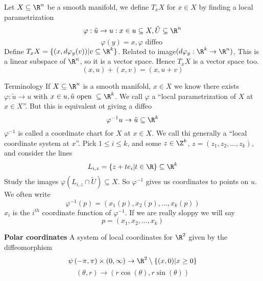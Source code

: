 \begin{definition}
  Let $X \subseteq \R^n$ be a smooth manifold, we define $T_xX$ for $x\in X$ by finding a local parametrization
    $$ \varphi: \tilde{u}\to u : x\in u \subseteq X, \tilde{U} \subseteq \R^n $$
    $$ \varphi(y)=x, \varphi \text{ diffeo }$$
  Define $T_xX=\{(x,d\varphi_y(v)) | v \subseteq \R^k\}$. Related to image$(d\varphi_y:\R^k\to \R^n )$,
  \newline This is a linear subspace of $\R^n$, so it is a vector space. Hence $T_xX$ is a vector space too.
    $$ \left(x,u\right)+\left(x,v \right)=\left(x,u+v\right)$$
\end{definition}
Terminology
\newline  If $X \subseteq \R^n $ is a smooth manifold, $x\in X$ we know there exists $\varphi:\tilde{u}\to u$ with $x\in u, \tilde{u} \text{ open }\subseteq \R^k$.
\newline We call $\varphi $ a ``local parametrization of $X$ at $x\in X$''. But this is equivalent ot giving a diffeo
  $$\varphi^{-1}u %
  \to \tilde{u} %
  \subseteq \R^k$$
  $\varphi^{-1}$ is called a coordinate chart for $X$ at $x\in X$.
\newline We call thi generally a ``local coordinate system at $x$''.
\newline Pick $1\leq i \leq k$, and some $z\in \Z^k$, $z=(z_1,z_2,\dots,z_k)$, and consider the lines
  $$L_{i,z}= \{ z+te_i |t\in \R \}\subseteq \R^k$$
Study the images $\varphi(L_{i,z}\cap \tilde{U})\subseteq X$.
\newline So $\varphi^{-1}$ gives us coordinates to points on $u$. We often write
  $$\varphi^{-1}(p)=\left(x_1(p),x_2(p),\dots,x_k(p)\right)$$
$x_i$ is the $i^{th}$ coordinate function of $\varphi^{-1}$. If we are really sloppy we will say
  $$p=(x_1,x_2,\dots,x_k)$$
\begin{example}
  \textbf{Polar coordinates}
  \newline A system of local coordinates for $\R^2$ given by the diffeomorphism
    $$ \psi \left(-\pi,\pi\right)\times \left(0,\infty\right)\to \R^2\setminus\{(x,0) | x\geq 0\}$$
    $$ \left(\theta, r\right)\to \left(r\cos(\theta),r\sin(\theta)\right)$$
\end{example}

